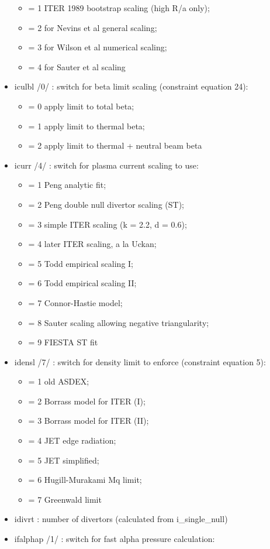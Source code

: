 \documentclass[]{article}
\providecommand{\tightlist}{%
  \setlength{\itemsep}{0pt}\setlength{\parskip}{0pt}}
\begin{document}
\begin{itemize}
  \begin{itemize}
  \tightlist
  \item
    = 1 ITER 1989 bootstrap scaling (high R/a only);
  \item
    = 2 for Nevins et al general scaling;
  \item
    = 3 for Wilson et al numerical scaling;
  \item
    = 4 for Sauter et al scaling
  \end{itemize}
\item
  iculbl /0/ : switch for beta limit scaling (constraint equation 24):

  \begin{itemize}
  \tightlist
  \item
    = 0 apply limit to total beta;
  \item
    = 1 apply limit to thermal beta;
  \item
    = 2 apply limit to thermal + neutral beam beta
  \end{itemize}
\item
  icurr /4/ : switch for plasma current scaling to use:

  \begin{itemize}
  \tightlist
  \item
    = 1 Peng analytic fit;
  \item
    = 2 Peng double null divertor scaling (ST);
  \item
    = 3 simple ITER scaling (k = 2.2, d = 0.6);
  \item
    = 4 later ITER scaling, a la Uckan;
  \item
    = 5 Todd empirical scaling I;
  \item
    = 6 Todd empirical scaling II;
  \item
    = 7 Connor-Hastie model;
  \item
    = 8 Sauter scaling allowing negative triangularity;
  \item
    = 9 FIESTA ST fit
  \end{itemize}
\item
  idensl /7/ : switch for density limit to enforce (constraint equation
  5):

  \begin{itemize}
  \tightlist
  \item
    = 1 old ASDEX;
  \item
    = 2 Borrass model for ITER (I);
  \item
    = 3 Borrass model for ITER (II);
  \item
    = 4 JET edge radiation;
  \item
    = 5 JET simplified;
  \item
    = 6 Hugill-Murakami Mq limit;
  \item
    = 7 Greenwald limit
  \end{itemize}
\item
  idivrt : number of divertors (calculated from i_single_null)
\item
  ifalphap /1/ : switch for fast alpha pressure calculation:


\end{itemize}
\end{document}
